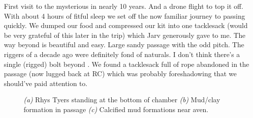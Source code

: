 First visit to the mysterious  in nearly 10 years. And a drone flight to top it off. With about 4 hours of fitful sleep we set off the now familiar journey to  passing quickly. We dumped our food and compressed our kit into one tacklesack (would be very grateful of this later in the trip) which Jarv generously gave to me.
The way beyond  is beautiful and easy. Large sandy passage with the odd pitch. The riggers of a decade ago were definitely fond of naturals. I don't think there's a single (rigged) bolt beyond . We found a tacklesack full of rope abandoned in the passage (now lugged back at RC) which was probably foreshadowing that we should've paid attention to. 


\begin{figure}[t]
\checkoddpage \ifoddpage \forcerectofloat \else \forceversofloat \fi
    \centering
          
    \begin{subfigure}[t]{\textwidth}
   		 \centering
		\caption{} \label{republika}
 		 \vspace{0cm}
      \end{subfigure}
              
     \begin{subfigure}[t]{0.355\textwidth}
       		 \centering
       		 \caption{} \label{Will Scott bolting}
      \end{subfigure}
      \hfill
      \begin{subfigure}[t]{0.629\textwidth}
       	 	\centering
        		\caption{} \label{mud formations}
    	\end{subfigure}

    \caption{
        	\emph{(a)}  Rhys Tyers standing at the bottom of \protect{} chamber
    	 \emph{(b)} Mud/clay formation in \protect{} passage 
  	 \emph{(c)} Calcified mud formations near  aven. }
\end{figure}


